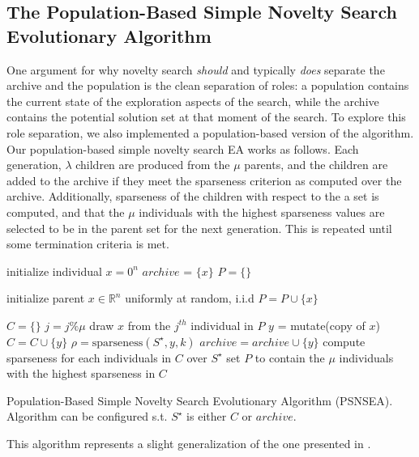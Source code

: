 \documentclass[twoside]{article}
\newcommand{\IR}{\mathbb{R}}
\begin{document}
\subsection{The Population-Based Simple Novelty Search Evolutionary Algorithm}
\label{subsec:psns}
One argument for why novelty search \emph{should} and typically \emph{does} separate the archive and the population is the clean separation of roles:  a population contains the current state of the exploration aspects of the search, while the archive contains the potential solution set at that moment of the search.  To explore this role separation, we also implemented a population-based version of the algorithm.  Our population-based simple novelty search EA works as follows.  Each generation, $\lambda$ children are produced from the $\mu$ parents, and the children are added to the archive if they meet the sparseness criterion as computed over the archive.  Additionally, sparseness of the children with respect to the a set is computed, and that the $\mu$ individuals with the highest sparseness values are selected to be in the parent set for the next generation.  This is repeated until some termination criteria is met.  
%
\begin{algorithm}[h]
  \SetAlgoLined
  \DontPrintSemicolon 
  
  \;
    
  initialize individual $x = 0^n$\;
  $archive$ = $\{x\}$\;
  $P = \{\}$
  
   {
    initialize parent $x \in \IR^n$ uniformly at random, i.i.d\;
    $P = P \cup \{x\}$\;
   }
   
   {
    $C = \{\}$\;
     {
      $j = j \% \mu$\;
      draw $x$ from the $j^{th}$ individual in $P$\;
      $y$ = mutate(copy of $x$)\;
      $C = C \cup \{y\}$\;
      $\rho = \mbox{sparseness}(S^\star, y, k)$\;
       {
        $archive = archive \cup \{y\}$\;
        }
     }
    compute sparseness for each individuals in $C$ over $S^\star$\;
    set $P$ to contain the $\mu$ individuals with the highest sparseness in $C$\; 
  }
  \caption{Population-Based Simple Novelty Search Evolutionary Algorithm (PSNSEA).  Algorithm can be configured s.t. $S^\star$ is either $C$ or $archive$.}
\end{algorithm}
%
This algorithm represents a slight generalization of the one presented in \citet{Wiegand2021flairs}.
\end{document}
